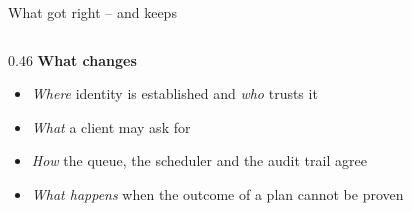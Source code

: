 \begin{frame}{What \legacy{} got right -- and \vtwo{} keeps}
\begin{columns}[T]
\begin{column}{0.46\textwidth}
            \vspace{0.2cm}
            \textbf{What \vtwo{} changes}
            \begin{itemize}
                \item \emph{Where} identity is established and \emph{who} trusts it
                \item \emph{What} a client may ask for
                \item \emph{How} the queue, the scheduler and the audit trail agree
                \item \emph{What happens} when the outcome of a plan cannot be proven
            \end{itemize}
            \vspace{0.15cm}
        \end{column}
    \end{columns}
\end{frame}

